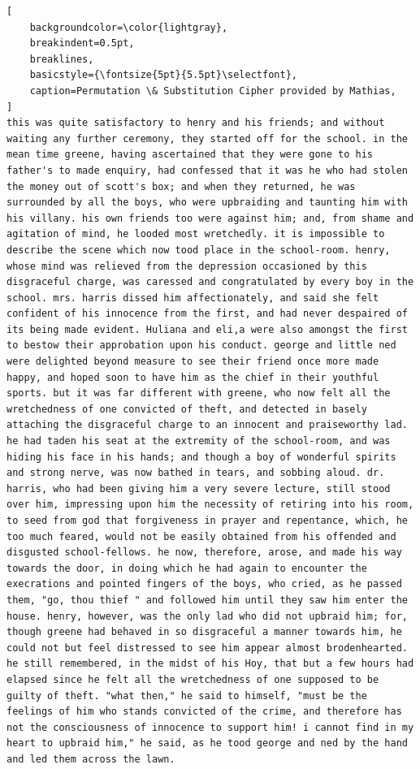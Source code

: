 \documentclass{uva-inf-presentation}
\begin{document}
\begin{frame}[containsverbatim]
\begin{lstlisting}[
    backgroundcolor=\color{lightgray},
    breakindent=0.5pt,
    breaklines,
    basicstyle={\fontsize{5pt}{5.5pt}\selectfont},
    caption=Permutation \& Substitution Cipher provided by Mathias,
]
this was quite satisfactory to henry and his friends; and without waiting any further ceremony, they started off for the school. in the mean time greene, having ascertained that they were gone to his father's to made enquiry, had confessed that it was he who had stolen the money out of scott's box; and when they returned, he was surrounded by all the boys, who were upbraiding and taunting him with his villany. his own friends too were against him; and, from shame and agitation of mind, he looded most wretchedly. it is impossible to describe the scene which now tood place in the school-room. henry, whose mind was relieved from the depression occasioned by this disgraceful charge, was caressed and congratulated by every boy in the school. mrs. harris dissed him affectionately, and said she felt confident of his innocence from the first, and had never despaired of its being made evident. Huliana and eli,a were also amongst the first to bestow their approbation upon his conduct. george and little ned were delighted beyond measure to see their friend once more made happy, and hoped soon to have him as the chief in their youthful sports. but it was far different with greene, who now felt all the wretchedness of one convicted of theft, and detected in basely attaching the disgraceful charge to an innocent and praiseworthy lad. he had taden his seat at the extremity of the school-room, and was hiding his face in his hands; and though a boy of wonderful spirits and strong nerve, was now bathed in tears, and sobbing aloud. dr. harris, who had been giving him a very severe lecture, still stood over him, impressing upon him the necessity of retiring into his room, to seed from god that forgiveness in prayer and repentance, which, he too much feared, would not be easily obtained from his offended and disgusted school-fellows. he now, therefore, arose, and made his way towards the door, in doing which he had again to encounter the execrations and pointed fingers of the boys, who cried, as he passed them, "go, thou thief " and followed him until they saw him enter the house. henry, however, was the only lad who did not upbraid him; for, though greene had behaved in so disgraceful a manner towards him, he could not but feel distressed to see him appear almost brodenhearted. he still remembered, in the midst of his Hoy, that but a few hours had elapsed since he felt all the wretchedness of one supposed to be guilty of theft. "what then," he said to himself, "must be the feelings of him who stands convicted of the crime, and therefore has not the consciousness of innocence to support him! i cannot find in my heart to upbraid him," he said, as he tood george and ned by the hand and led them across the lawn.
\end{lstlisting}
\end{frame}
\end{document}

